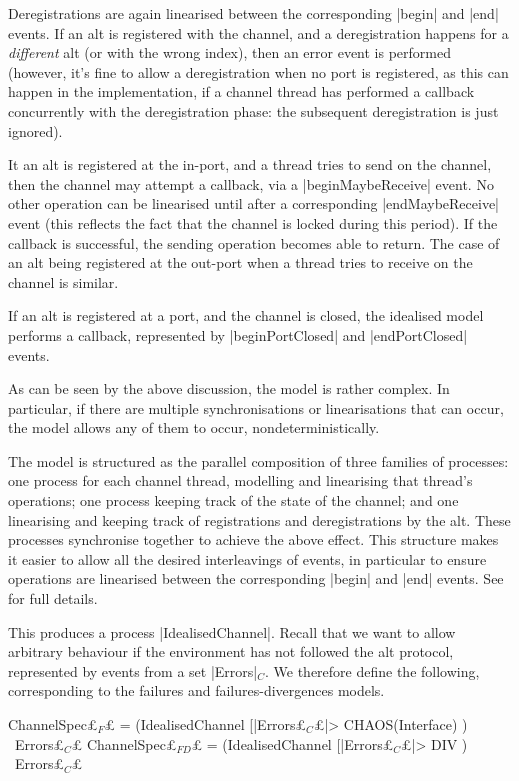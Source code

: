 Deregistrations are again linearised between the corresponding |begin| and
|end| events.  If an alt is registered with the channel, and a deregistration
happens for a \emph{different} alt (or with the wrong index), then an error
event is performed (however, it's fine to allow a deregistration when no port
is registered, as this can happen in the implementation, if a channel thread
has performed a callback concurrently with the deregistration phase: the
subsequent deregistration is just ignored).

It an alt is registered at the in-port, and a thread tries to send on the
channel, then the channel may attempt a callback, via a |beginMaybeReceive|
event.  No other operation can be linearised until after a corresponding
|endMaybeReceive| event (this reflects the fact that the channel is locked
during this period).  If the callback is successful, the sending operation
becomes able to return.  The case of an alt being registered at the out-port
when a thread tries to receive on the channel is similar.

If an alt is registered at a port, and the channel is closed, the idealised
model performs a callback, represented by |beginPortClosed| and
|endPortClosed| events.

As can be seen by the above discussion, the model is rather complex.  In
particular, if there are multiple synchronisations or linearisations that can
occur, the model allows any of them to occur, nondeterministically.  

The model is structured as the parallel composition of three families of
processes: one process for each channel thread, modelling and linearising that
thread's operations; one process keeping track of the state of the channel;
and one linearising and keeping track of registrations and deregistrations by
the alt.  These processes synchronise together to achieve the above effect.
This structure makes it easier to allow all the desired interleavings of
events, in particular to ensure operations are linearised between the
corresponding |begin| and |end| events.  See~\cite{TR} for full details.

This produces a process |IdealisedChannel|.  Recall that we want to allow
arbitrary behaviour if the environment has not followed the alt protocol,
represented by events from a set |Errors|$_C$.  
We therefore define the following, corresponding to the failures and
failures-divergences models.
\begin{cspm}
ChannelSpec£$_F$£ = (IdealisedChannel [|Errors£$_C$£|> CHAOS(Interface) ) \ Errors£$_C$£
ChannelSpec£$_{FD}$£ = (IdealisedChannel [|Errors£$_C$£|> DIV ) \ Errors£$_C$£
\end{cspm}

